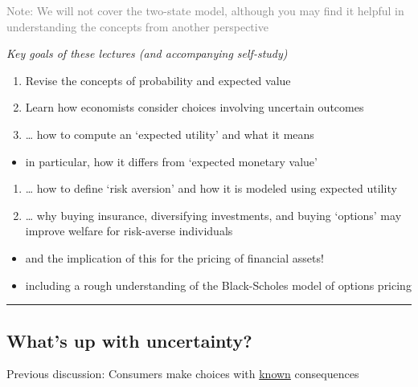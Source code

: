 \documentclass[]{article}
\providecommand{\tightlist}{%
  \setlength{\itemsep}{0pt}\setlength{\parskip}{0pt}}
\begin{document}
\textcolor{gray}{Note: We will not cover the two-state model, although you may find it helpful in understanding the concepts from another perspective}

\emph{Key goals of these lectures (and accompanying self-study)}

\begin{enumerate}
\def\labelenumi{\arabic{enumi}.}
\tightlist
\item
  Revise the concepts of probability and expected value
\item
  Learn how economists consider choices involving uncertain outcomes
\item
  \ldots{} how to compute an `expected utility' and what it means
\end{enumerate}

\begin{itemize}
\tightlist
\item
  in particular, how it differs from `expected monetary value'
\end{itemize}

\begin{enumerate}
\def\labelenumi{\arabic{enumi}.}
\tightlist
\item
  \ldots{} how to define `risk aversion' and how it is modeled using expected utility
\item
  \ldots{} why buying insurance, diversifying investments, and buying `options' may improve welfare for risk-averse individuals
\end{enumerate}

\begin{itemize}
\item
  and the implication of this for the pricing of financial assets!
\item
  including a rough understanding of the Black-Scholes model of options pricing
\end{itemize}

\begin{center}\rule{0.5\linewidth}{\linethickness}\end{center}

\hypertarget{whats-up-with-uncertainty}{%
\subsection{What's up with uncertainty?}\label{whats-up-with-uncertainty}}

Previous discussion: Consumers make choices with \underline{known} consequences
\end{document}
